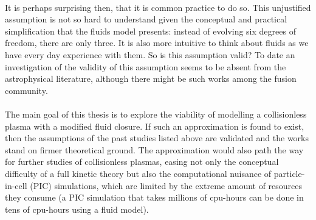 \\
It is perhaps surprising then, that it is common practice to do so. This unjustified assumption is not so hard to understand given the conceptual and practical simplification that the fluids model presents: instead of evolving six degrees of freedom, there are only three. It is also more intuitive to think about fluids as we have every day experience with them. So is this assumption valid? To date an investigation of the validity of this assumption seems to be absent from the astrophysical literature, although there might be such works among the fusion community.\\
\\
The main goal of this thesis is to explore the viability of modelling a collisionless plasma with a modified fluid closure. If such an approximation is found to exist, then the assumptions of the past studies listed above are validated and the works stand on firmer theoretical ground. The approximation would also path the way for further studies of collisionless plasmas, easing not only the conceptual difficulty of a full kinetic theory but also the computational nuisance of particle-in-cell (PIC) simulations, which are limited by the extreme amount of resources they consume (a PIC simulation that takes millions of cpu-hours can be done in tens of cpu-hours using a fluid model).

